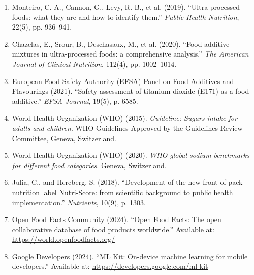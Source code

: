 \documentclass[12pt]{article}
\begin{document}
\begin{enumerate}
    \item Monteiro, C. A., Cannon, G., Levy, R. B., et al. (2019). ``Ultra-processed foods: what they are and how to identify them.'' \textit{Public Health Nutrition}, 22(5), pp. 936--941.
    
    \vspace{0.2cm}
    \item Chazelas, E., Srour, B., Deschasaux, M., et al. (2020). ``Food additive mixtures in ultra-processed foods: a comprehensive analysis.'' \textit{The American Journal of Clinical Nutrition}, 112(4), pp. 1002--1014.
    
    \vspace{0.2cm}
    \item European Food Safety Authority (EFSA) Panel on Food Additives and Flavourings (2021). ``Safety assessment of titanium dioxide (E171) as a food additive.'' \textit{EFSA Journal}, 19(5), p. 6585.
    
    \vspace{0.2cm}
    \item World Health Organization (WHO) (2015). \textit{Guideline: Sugars intake for adults and children}. WHO Guidelines Approved by the Guidelines Review Committee, Geneva, Switzerland.
    
    \vspace{0.2cm}
    \item World Health Organization (WHO) (2020). \textit{WHO global sodium benchmarks for different food categories}. Geneva, Switzerland.
    
    \vspace{0.2cm}
    \item Julia, C., and Hercberg, S. (2018). ``Development of the new front-of-pack nutrition label Nutri-Score: from scientific background to public health implementation.'' \textit{Nutrients}, 10(9), p. 1303.
    
    \vspace{0.2cm}
    \item Open Food Facts Community (2024). ``Open Food Facts: The open collaborative database of food products worldwide.'' Available at: \url{https://world.openfoodfacts.org/}
    
    \vspace{0.2cm}
    \item Google Developers (2024). ``ML Kit: On-device machine learning for mobile developers.'' Available at: \url{https://developers.google.com/ml-kit}
    

\end{enumerate}
\end{document}
